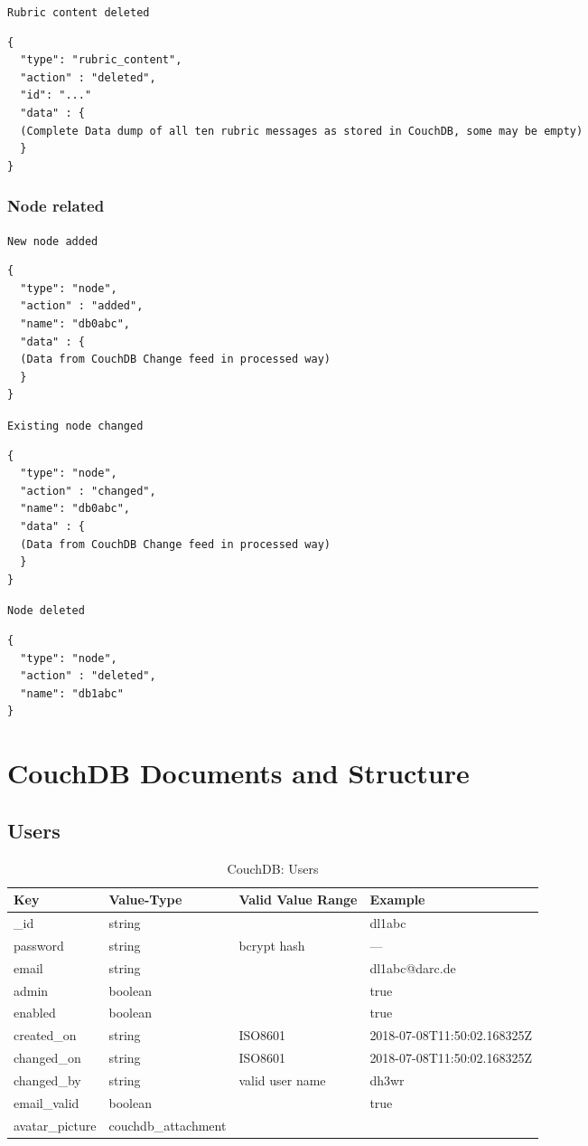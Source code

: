 \texttt{Rubric content deleted}
\begin{lstlisting}
{
  "type": "rubric_content",
  "action" : "deleted",
  "id": "..."
  "data" : {
  (Complete Data dump of all ten rubric messages as stored in CouchDB, some may be empty)
  }
}
\end{lstlisting}


\subsubsection{Node related}
\texttt{New node added}
\begin{lstlisting}
{
  "type": "node",
  "action" : "added",
  "name": "db0abc",
  "data" : {
  (Data from CouchDB Change feed in processed way)
  }
}
\end{lstlisting}

\texttt{Existing node changed}
\begin{lstlisting}
{
  "type": "node",
  "action" : "changed",
  "name": "db0abc",
  "data" : {
  (Data from CouchDB Change feed in processed way)
  }
}
\end{lstlisting}

\texttt{Node deleted}
\begin{lstlisting}
{
  "type": "node",
  "action" : "deleted",
  "name": "db1abc"
}
\end{lstlisting}


\section{CouchDB Documents and Structure}

\subsection{Users}

\begin{table}[h]
 \centering
 \caption{CouchDB: Users}
 \begin{tabular}{|l|l|l|l|} \hline
  Key & Value-Type & Valid Value Range & Example \\
  \hline
  \_id & string & & dl1abc \\
  password & string & bcrypt hash & --- \\
  email & string & & dl1abc@darc.de \\
  admin & boolean & & true \\
  enabled & boolean & & true \\
  created\_on & string & ISO8601 & 2018-07-08T11:50:02.168325Z \\
  changed\_on & string & ISO8601 & 2018-07-08T11:50:02.168325Z \\
  changed\_by & string & valid user name & dh3wr \\
  email\_valid & boolean & & true \\
  avatar\_picture & couchdb\_attachment & & \\ \hline
  \end{tabular}
  \label{tab:couchdb:users}
\end{table}

